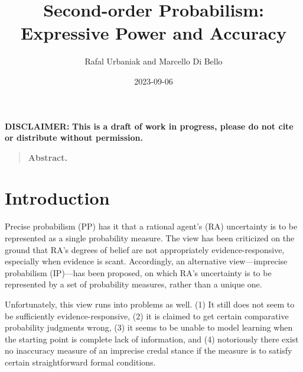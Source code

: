 \documentclass[
  letterpaper,
  DIV=11,
  numbers=noendperiod]{scrartcl}
\title{Second-order Probabilism: Expressive Power and Accuracy}
\author{Rafal Urbaniak and Marcello Di Bello}
\date{2023-09-06}
\renewcommand*\contentsname{Table of contents}
\newcommand\contentsname{Table of contents}
\begin{document}
\maketitle
\ifdefined\Shaded\renewenvironment{Shaded}{\begin{tcolorbox}[sharp corners, enhanced, interior hidden, borderline west={3pt}{0pt}{shadecolor}, breakable, frame hidden, boxrule=0pt]}{\end{tcolorbox}}\fi

\renewcommand*\contentsname{Table of contents}
{
\hypersetup{linkcolor=}
\setcounter{tocdepth}{3}
\tableofcontents
}
\vspace{2cm}

\noindent \textbf{DISCLAIMER:}
\textbf{This is a draft of work in progress, please do not cite or distribute without permission.}

\thispagestyle{empty}

\newpage

\begin{quote} \textbf{Abstract.}  

\end{quote}

\hypertarget{introduction}{%
\section{Introduction}\label{introduction}}

\label{sec:introduction}

Precise probabilism (PP) has it that a rational agent's (RA) uncertainty
is to be represented as a single probability measure. The view has been
criticized on the ground that RA's degrees of belief are not
appropriately evidence-responsive, especially when evidence is scant.
Accordingly, an alternative view---imprecise probabilism (IP)---has been
proposed, on which RA's uncertainty is to be represented by a set of
probability measures, rather than a unique one.

Unfortunately, this view runs into problems as well. (1) It still does
not seem to be sufficiently evidence-responsive, (2) it is claimed to
get certain comparative probability judgments wrong, (3) it seems to be
unable to model learning when the starting point is complete lack of
information, and (4) notoriously there exist no inaccuracy measure of an
imprecise credal stance if the measure is to satisfy certain
straightforward formal conditions.

\end{document}
